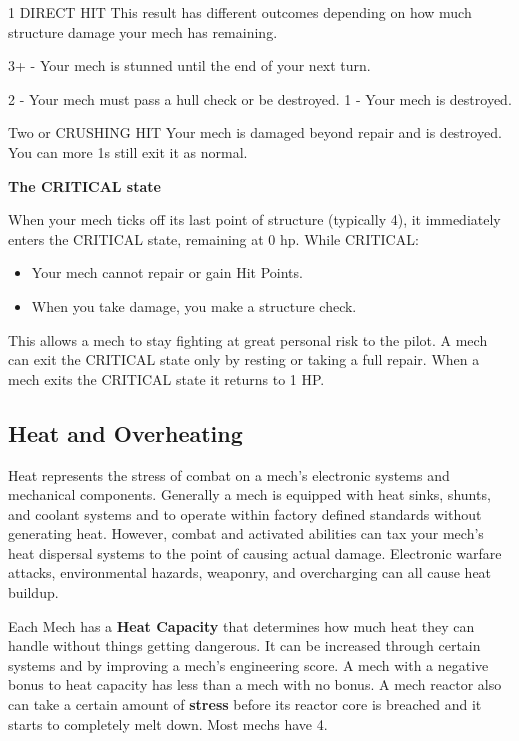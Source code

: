  1               DIRECT HIT               This result has different outcomes depending on how much
                                          structure damage your mech has remaining.

                                          3+ - Your mech is stunned until the end of your next turn.

                                          2 - Your mech must pass a hull check or be destroyed.
                                          1 - Your mech is destroyed.

 Two or          CRUSHING HIT             Your mech is damaged beyond repair and is destroyed. You can
 more 1s                                  still exit it as normal.

 \begin{center}
   \textbf{The CRITICAL state}
 \end{center}

When your mech ticks off its last point of structure (typically 4), it immediately enters the CRITICAL state, remaining at 0 hp. While CRITICAL:
\begin{itemize}
\item Your mech cannot repair or gain Hit Points. 
\item When you take damage, you make a structure check.
\end{itemize}  
This allows a mech to stay fighting at great personal risk to the pilot. A mech can exit the CRITICAL state only by resting or taking a full repair. When a mech exits the CRITICAL state it returns to 1 HP.

\subsection{Heat and Overheating}

Heat represents the stress of combat on a mech's electronic systems and mechanical components. Generally a mech is equipped with heat sinks, shunts, and coolant systems and to operate within factory defined standards without generating heat. However, combat and activated abilities can tax your mech's heat dispersal systems to the point of causing actual damage. Electronic warfare attacks, environmental hazards, weaponry, and overcharging can all cause heat buildup. 

Each Mech has a \textbf{Heat Capacity} that determines how much heat they can handle without things getting dangerous. It can be increased through certain systems and by improving a mech's engineering score. A mech with a negative bonus to heat capacity has less than a mech with no bonus. A mech reactor also can take a certain amount of \textbf{stress} before its reactor core is breached and it starts to completely melt down. Most mechs have 4. 

